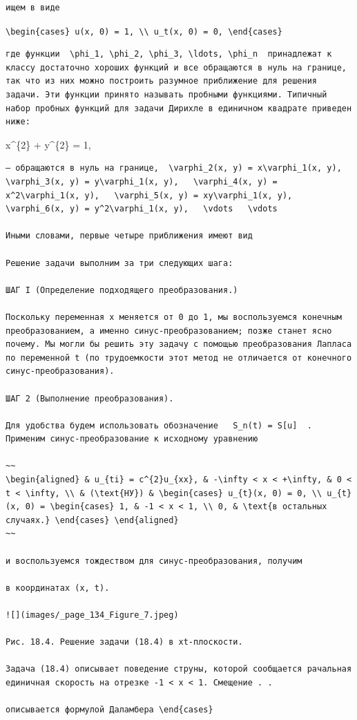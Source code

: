 \documentclass[
  ukrainian,
]{article}
\begin{document}
\begin{verbatim}
ищем в виде
\end{verbatim}

\texttt{\textbackslash{}begin\{cases\}\ u(x,\ 0)\ =\ 1,\ \textbackslash{}\textbackslash{}\ u\_t(x,\ 0)\ =\ 0,\ \textbackslash{}end\{cases\}}

\begin{verbatim}
где функции  \phi_1, \phi_2, \phi_3, \ldots, \phi_n  принадлежат к классу достаточно хороших функций и все обращаются в нуль на границе, так что из них можно построить разумное приближение для решения задачи. Эти функции принято называть пробными функциями. Типичный набор пробных функций для задачи Дирихле в единичном квадрате приведен ниже:
\end{verbatim}

x\^{}\{2\} + y\^{}\{2\} = 1,

\begin{verbatim}
— обращаются в нуль на границе,  \varphi_2(x, y) = x\varphi_1(x, y),   \varphi_3(x, y) = y\varphi_1(x, y),   \varphi_4(x, y) = x^2\varphi_1(x, y),   \varphi_5(x, y) = xy\varphi_1(x, y),   \varphi_6(x, y) = y^2\varphi_1(x, y),   \vdots   \vdots 

Иными словами, первые четыре приближения имеют вид

Решение задачи выполним за три следующих шага:

ШАГ І (Определение подходящего преобразования.)

Поскольку переменная x меняется от 0 до 1, мы воспользуемся конечным преобразованием, а именно синус-преобразованием; позже станет ясно почему. Мы могли бы решить эту задачу с помощью преобразования Лапласа по переменной t (по трудоемкости этот метод не отличается от конечного синус-преобразования).

ШАГ 2 (Выполнение преобразования).

Для удобства будем использовать обозначение   S_n(t) = S[u]  . Применим синус-преобразование к исходному уравнению

~~
\begin{aligned} & u_{ti} = c^{2}u_{xx}, & -\infty < x < +\infty, & 0 < t < \infty, \\ & (\text{НУ}) & \begin{cases} u_{t}(x, 0) = 0, \\ u_{t}(x, 0) = \begin{cases} 1, & -1 < x < 1, \\ 0, & \text{в остальных случаях.} \end{cases} \end{aligned}
~~

и воспользуемся тождеством для синус-преобразования, получим

в координатах (x, t).

![](images/_page_134_Figure_7.jpeg)

Рис. 18.4. Решение задачи (18.4) в xt-плоскости.

Задача (18.4) описывает поведение струны, которой сообщается рачальная единичная скорость на отрезке -1 < x < 1. Смещение . .

описывается формулой Даламбера \end{cases}
\end{verbatim}
\end{document}
